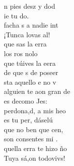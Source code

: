 \documentclass[12pt]{article}
\begin{document}
\begin{multicols*}{2}
\begin{cancion}%
	n pies desz y dod\\
	ie  tu do.\\
	 facha s a nadie int\\
	¡Tunca lovas al!\\
	que sas  la erra\\
	los ros nolo   \\
	que túives la eera\\
	de que s de poseer\\
	sta aquello e no v\\
	 alguien te aon gran de\\
	es decomo Jes:\\
	perdona,d, a mis heo\\
	es tu per, dáselú\\
	que no ben que cen,\\
	son consentes mi .\\
	quella erra  te hizo ño\\
	Tuya sá,on todovivs! \\
\end{cancion}%


\end{multicols*}
\end{document}
